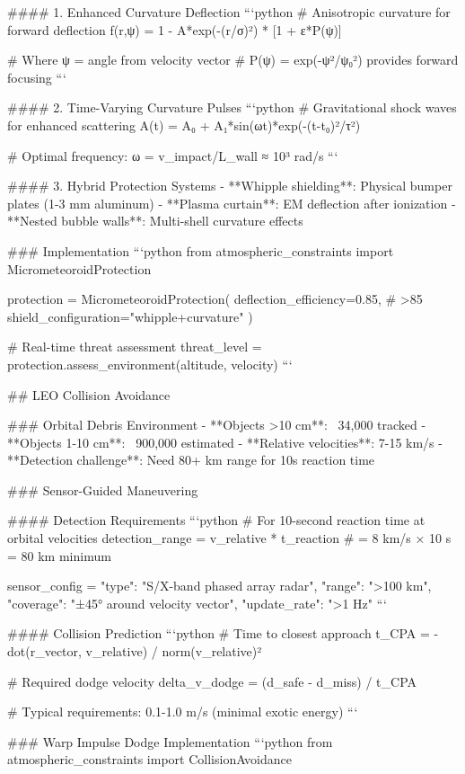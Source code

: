 #### 1. Enhanced Curvature Deflection
```python
# Anisotropic curvature for forward deflection
f(r,ψ) = 1 - A*exp(-(r/σ)²) * [1 + ε*P(ψ)]

# Where ψ = angle from velocity vector
# P(ψ) = exp(-ψ²/ψ₀²) provides forward focusing
```

#### 2. Time-Varying Curvature Pulses
```python
# Gravitational shock waves for enhanced scattering
A(t) = A₀ + A₁*sin(ωt)*exp(-(t-t₀)²/τ²)

# Optimal frequency: ω = v_impact/L_wall ≈ 10³ rad/s
```

#### 3. Hybrid Protection Systems
- **Whipple shielding**: Physical bumper plates (1-3 mm aluminum)
- **Plasma curtain**: EM deflection after ionization
- **Nested bubble walls**: Multi-shell curvature effects

### Implementation
```python
from atmospheric_constraints import MicrometeoroidProtection

protection = MicrometeoroidProtection(
    deflection_efficiency=0.85,  # >85%
    shield_configuration="whipple+curvature"
)

# Real-time threat assessment
threat_level = protection.assess_environment(altitude, velocity)
```

## LEO Collision Avoidance

### Orbital Debris Environment
- **Objects >10 cm**: ~34,000 tracked
- **Objects 1-10 cm**: ~900,000 estimated  
- **Relative velocities**: 7-15 km/s
- **Detection challenge**: Need 80+ km range for 10s reaction time

### Sensor-Guided Maneuvering

#### Detection Requirements
```python
# For 10-second reaction time at orbital velocities
detection_range = v_relative * t_reaction
# = 8 km/s × 10 s = 80 km minimum

sensor_config = {
    "type": "S/X-band phased array radar",
    "range": ">100 km",
    "coverage": "±45° around velocity vector",
    "update_rate": ">1 Hz"
}
```

#### Collision Prediction
```python
# Time to closest approach
t_CPA = -dot(r_vector, v_relative) / norm(v_relative)²

# Required dodge velocity  
delta_v_dodge = (d_safe - d_miss) / t_CPA

# Typical requirements: 0.1-1.0 m/s (minimal exotic energy)
```

### Warp Impulse Dodge Implementation
```python
from atmospheric_constraints import CollisionAvoidance

